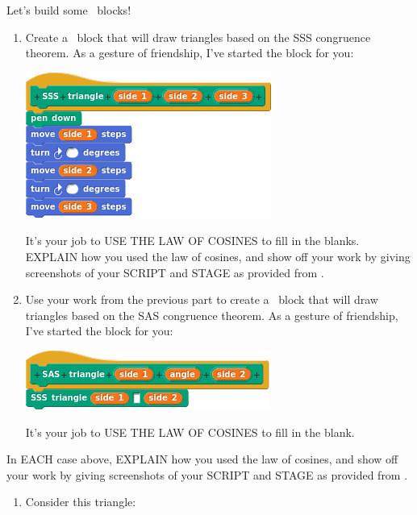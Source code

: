 \documentclass[noauthor,nooutcomes,handout,hints]{ximera}
\begin{document}
\begin{question}
  Let's build some \snap\ blocks!
  \begin{enumerate}
  \item Create a \snap\ block that will draw triangles based on the
    SSS congruence theorem.  As a gesture of friendship, I've started
    the block for you:
    \begin{center}
      \includegraphics{sssBlockBLANK}
    \end{center}
    It's your job to USE THE LAW OF COSINES to fill in the
    blanks. EXPLAIN how you used the law of cosines, and show off your
    work by giving screenshots of your SCRIPT and STAGE as provided
    from \snap.
  \item Use your work from the previous part to create a \snap\ block
    that will draw triangles based on the SAS congruence theorem.  As
    a gesture of friendship, I've started the block for you:
    \begin{center}
      \includegraphics{sasBlockBLANK}
    \end{center}
    It's your job to USE THE LAW OF COSINES to fill in the
    blank.
  \end{enumerate}
    In EACH case above, EXPLAIN how you used the law of cosines, and
    show off your work by giving screenshots of your SCRIPT and STAGE
    as provided from \snap.
    \begin{freeResponse}
      \begin{enumerate}
      \item Consider this triangle:
        \begin{center}
\end{center}
\end{enumerate}
\end{freeResponse}
\end{question}
\end{document}
